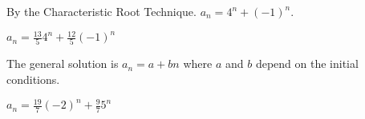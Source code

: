 \documentclass[11pt]{exam}
\begin{document}
\begin{questions}
\question By the Characteristic Root Technique.  $a_n = 4^n + (-1)^n$.

\question $a_n = \frac{13}{5} 4^n + \frac{12}{5} (-1)^n$


\question The general solution is $a_n = a + bn$ where $a$ and $b$ depend on the initial conditions.  %

\question $a_n = \frac{19}{7}(-2)^n + \frac{9}{7}5^n$





 
\end{questions}
\end{document}
